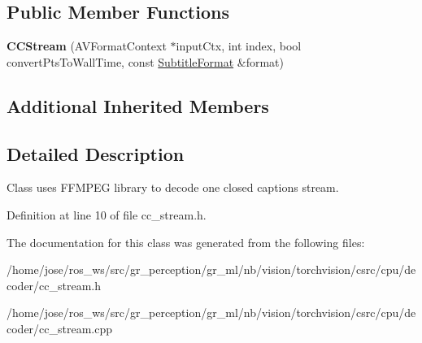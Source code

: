 \subsection*{Public Member Functions}
\begin{DoxyCompactItemize}
\item 
\mbox{\label{classffmpeg_1_1CCStream_ae9bf5a7f85d8ebff929b70a3f9f214dd}} 
{\bfseries C\+C\+Stream} (A\+V\+Format\+Context $\ast$input\+Ctx, int index, bool convert\+Pts\+To\+Wall\+Time, const \hyperlink{structffmpeg_1_1SubtitleFormat}{Subtitle\+Format} \&format)
\end{DoxyCompactItemize}
\subsection*{Additional Inherited Members}


\subsection{Detailed Description}
Class uses F\+F\+M\+P\+EG library to decode one closed captions stream. 

Definition at line 10 of file cc\+\_\+stream.\+h.



The documentation for this class was generated from the following files\+:\begin{DoxyCompactItemize}
\item 
/home/jose/ros\+\_\+ws/src/gr\+\_\+perception/gr\+\_\+ml/nb/vision/torchvision/csrc/cpu/decoder/cc\+\_\+stream.\+h\item 
/home/jose/ros\+\_\+ws/src/gr\+\_\+perception/gr\+\_\+ml/nb/vision/torchvision/csrc/cpu/decoder/cc\+\_\+stream.\+cpp\end{DoxyCompactItemize}
